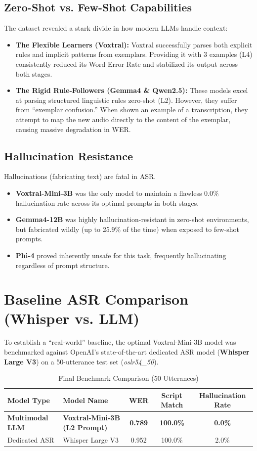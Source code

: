 \documentclass[12pt]{article}
\begin{document}
\subsection{Zero-Shot vs. Few-Shot Capabilities}
The dataset revealed a stark divide in how modern LLMs handle context:
\begin{itemize}
    \item \textbf{The Flexible Learners (Voxtral):} Voxtral successfully parses both explicit rules and implicit patterns from exemplars. Providing it with 3 examples (L4) consistently reduced its Word Error Rate and stabilized its output across both stages.
    \item \textbf{The Rigid Rule-Followers (Gemma4 \& Qwen2.5):} These models excel at parsing structured linguistic rules zero-shot (L2). However, they suffer from ``exemplar confusion.'' When shown an example of a transcription, they attempt to map the new audio directly to the content of the exemplar, causing massive degradation in WER.
\end{itemize}

\subsection{Hallucination Resistance}
Hallucinations (fabricating text) are fatal in ASR. 
\begin{itemize}
    \item \textbf{Voxtral-Mini-3B} was the only model to maintain a flawless 0.0\% hallucination rate across its optimal prompts in both stages.
    \item \textbf{Gemma4-12B} was highly hallucination-resistant in zero-shot environments, but fabricated wildly (up to 25.9\% of the time) when exposed to few-shot prompts.
    \item \textbf{Phi-4} proved inherently unsafe for this task, frequently hallucinating regardless of prompt structure.
\end{itemize}

\section{Baseline ASR Comparison (Whisper vs. LLM)}
To establish a ``real-world'' baseline, the optimal Voxtral-Mini-3B model was benchmarked against OpenAI's state-of-the-art dedicated ASR model (\textbf{Whisper Large V3}) on a 50-utterance test set (\textit{oslr54\_50}). 

\begin{table}[H]
\centering
\caption{Final Benchmark Comparison (50 Utterances)}
\begin{tabularx}{\textwidth}{@{} l X c c c @{}}
\toprule
\textbf{Model Type} & \textbf{Model Name} & \textbf{WER} & \textbf{Script Match} & \textbf{Hallucination Rate} \\
\midrule
\textbf{Multimodal LLM} & \textbf{Voxtral-Mini-3B (L2 Prompt)} & \textbf{0.789} & \textbf{100.0\%} & \textbf{0.0\%} \\
Dedicated ASR & Whisper Large V3 & 0.952 & 100.0\% & 2.0\% \\
\bottomrule
\end{tabularx}
\end{table}
\end{document}
